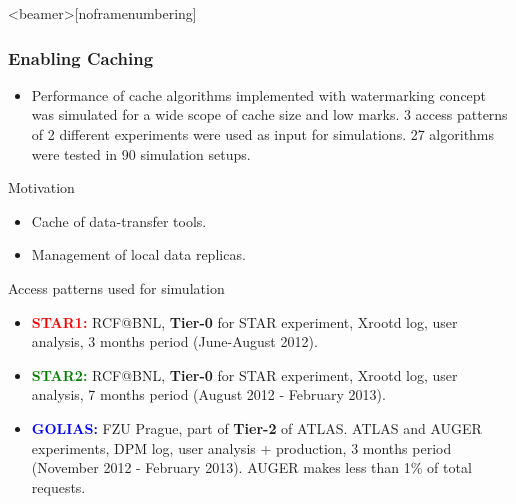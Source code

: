 \documentclass{beamer}
\begin{document}
\begin{frame}<beamer>[noframenumbering]\frametitle{Enabling Caching}
\begin{block}{}
\vspace{-5mm}
    \begin{itemize}
        \item Performance of cache algorithms implemented with watermarking concept was simulated for a wide scope of cache size and low marks. 3 access patterns of 2 different experiments were used as input for simulations. 27 algorithms were tested in 90 simulation setups.        
    \end{itemize}
\end{block} 
\vspace{-2mm}
\begin{block}{Motivation}
    \begin{itemize}
        \item Cache of data-transfer tools.   
        \item Management of local data replicas. 
    \end{itemize}
   
\end{block}    


\begin{footnotesize}
\vspace{-2mm}
\begin{block}{Access patterns used for simulation}
\begin{itemize}
	\item[]\textbf{\textcolor{red}{STAR1:}} RCF@BNL, \textbf{Tier-0} for STAR experiment, Xrootd log, user analysis,  3 months period (June-August 2012).

	\item[]\textbf{\textcolor{green}{STAR2:}} RCF@BNL, \textbf{Tier-0} for STAR experiment, Xrootd log, user analysis, 7 months period (August 2012 - February  2013).

	\item[]\textbf{\textcolor{blue}{GOLIAS:}} FZU Prague, part of \textbf{Tier-2} of ATLAS. ATLAS and AUGER experiments, DPM log, user analysis + production,  3 months period (November 2012 - February  2013). AUGER makes less than  1\% of total requests.
\end{itemize}
\end{block}
\end{footnotesize}            
\end{frame}
\end{document}
